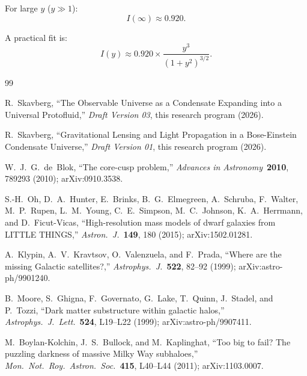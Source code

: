 \documentclass[11pt,a4paper]{article}
\theoremstyle{definition}
\theoremstyle{remark}
\begin{document}
For large $y$ ($y \gg 1$):
\begin{equation}
I(\infty) \approx 0.920.
\end{equation}

A practical fit is:
\begin{equation}
I(y) \approx 0.920 \times \frac{y^3}{(1 + y^2)^{3/2}}.
\end{equation}


\begin{thebibliography}{99}

R.~Skavberg, ``The Observable Universe as a Condensate Expanding into a Universal Protofluid,''
\emph{Draft Version 03}, this research program (2026).

R.~Skavberg, ``Gravitational Lensing and Light Propagation in a Bose-Einstein Condensate Universe,''
\emph{Draft Version 01}, this research program (2026).


W.~J.~G.~de~Blok,
``The core-cusp problem,''
\emph{Advances in Astronomy}\ \textbf{2010}, 789293 (2010);
arXiv:0910.3538.

S.-H.~Oh, D.~A.~Hunter, E.~Brinks, B.~G.~Elmegreen, A.~Schruba, F.~Walter, M.~P.~Rupen, L.~M.~Young, C.~E.~Simpson, M.~C.~Johnson, K.~A.~Herrmann, and D.~Ficut-Vicas,
``High-resolution mass models of dwarf galaxies from LITTLE THINGS,''
\emph{Astron.\ J.}\ \textbf{149}, 180 (2015);
arXiv:1502.01281.

A.~Klypin, A.~V.~Kravtsov, O.~Valenzuela, and F.~Prada,
``Where are the missing Galactic satellites?,''
\emph{Astrophys.\ J.}\ \textbf{522}, 82--92 (1999);
arXiv:astro-ph/9901240.

B.~Moore, S.~Ghigna, F.~Governato, G.~Lake, T.~Quinn, J.~Stadel, and P.~Tozzi,
``Dark matter substructure within galactic halos,''
\emph{Astrophys.\ J.\ Lett.}\ \textbf{524}, L19--L22 (1999);
arXiv:astro-ph/9907411.

M.~Boylan-Kolchin, J.~S.~Bullock, and M.~Kaplinghat,
``Too big to fail? The puzzling darkness of massive Milky Way subhaloes,''
\emph{Mon.\ Not.\ Roy.\ Astron.\ Soc.}\ \textbf{415}, L40--L44 (2011);
arXiv:1103.0007.


\end{thebibliography}
\end{document}
